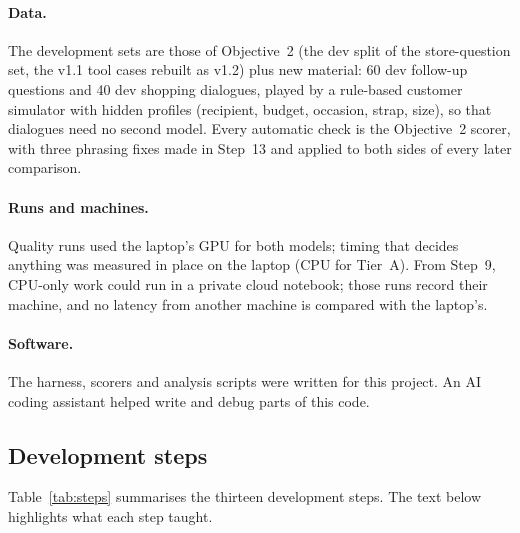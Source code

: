 \documentclass[11pt,a4paper]{article}
\begin{document}
\paragraph{Data.} The development sets are those of Objective~2 (the dev split of the store-question set, the v1.1
tool cases rebuilt as v1.2) plus new material: 60 dev follow-up questions and 40 dev shopping dialogues, played by a
rule-based customer simulator with hidden profiles (recipient, budget, occasion, strap, size), so that dialogues need
no second model. Every automatic check is the Objective~2 scorer, with three phrasing fixes made in Step~13 and applied
to both sides of every later comparison.

\paragraph{Runs and machines.} Quality runs used the laptop's GPU for both models; timing that decides anything was
measured in place on the laptop (CPU for Tier~A). From Step~9, CPU-only work could run in a private cloud notebook;
those runs record their machine, and no latency from another machine is compared with the laptop's.

\paragraph{Software.} The harness, scorers and analysis scripts were written for this project. An AI coding assistant
helped write and debug parts of this code.

\subsection{Development steps}
Table~\ref{tab:steps} summarises the thirteen development steps. The text below highlights what each step taught.
\end{document}
